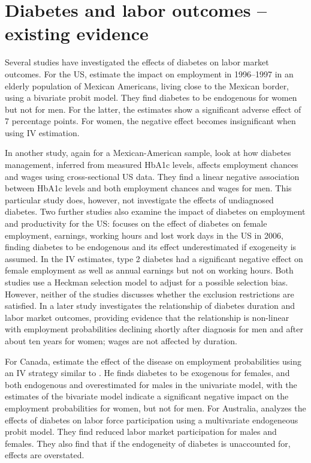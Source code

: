 \documentclass[12pt,english,british]{article}
\begin{document}
\section{\label{sec:Labor  outcomes and diabetes literature} Diabetes and labor outcomes -- existing evidence }

Several studies have investigated the effects of diabetes on labor market outcomes. For the US, \citet{Brown2005} estimate  the impact on employment in 1996--1997 in an elderly population of Mexican Americans, living close to the Mexican border, using a bivariate probit model. They find diabetes to be endogenous for women but not for men.  For the latter, the estimates show a significant adverse effect of 7 percentage points. For women, the negative effect becomes insignificant when using IV estimation. 

In another study, again for a Mexican-American sample, \citet{BrownIII2011} look at how diabetes management, inferred from measured \ac{HbA1c} levels, affects employment chances and wages using cross-sectional US data. They find a linear negative association between \ac{HbA1c} levels and both employment chances and wages for men. This particular study does, however, not investigate the effects of undiagnosed diabetes. Two further studies also examine the impact of diabetes on employment and productivity for the US: \citet{Minor2010} focuses on the effect of diabetes on female employment, earnings, working hours and lost work days in the \ac{US} in 2006, finding diabetes to be endogenous and its effect underestimated if exogeneity is assumed. In the \ac{IV} estimates, type 2 diabetes had a significant negative effect on female employment as well as annual earnings but not on working hours. Both studies use a Heckman selection model to adjust for a possible selection bias. However, neither of the studies discusses whether the exclusion restrictions are satisfied. In a later study \citet{Minor2013} investigates the relationship of diabetes duration and labor market outcomes, providing evidence that the relationship is non-linear with employment probabilities declining shortly after diagnosis for men and after about ten years for women; wages are not affected by duration.

For Canada, \citet{Latif2009} estimate the effect of the disease on employment probabilities using an \ac{IV} strategy similar to \citet{Brown2005}. He finds diabetes to be exogenous for females, and both endogenous and overestimated for males in the univariate model, with the estimates of the bivariate model indicate a significant negative impact on the employment probabilities for women, but not for men. 
For Australia, \cite{Zhang2009} analyzes the effects of diabetes on labor force participation using a multivariate endogeneous probit model. They find reduced labor market participation for males and females. They also find that if the endogeneity of diabetes is unaccounted for, effects are overstated. 
\end{document}
